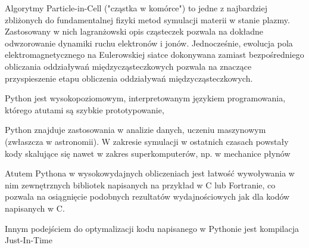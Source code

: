 Algorytmy Particle-in-Cell ("cząstka w komórce") to jedne z najbardziej zbliżonych do fundamentalnej fizyki metod symulacji
materii w stanie plazmy. Zastosowany w nich lagranżowski opis cząsteczek pozwala na dokładne odwzorowanie dynamiki ruchu
elektronów i jonów. Jednocześnie, ewolucja pola elektromagnetycznego na Eulerowskiej siatce dokonywana zamiast bezpośredniego obliczania
oddziaływań międzycząsteczkowych pozwala na znaczące przyspieszenie etapu obliczenia oddziaływań międzycząsteczkowych.

Python jest wysokopoziomowym, interpretowanym językiem programowania, którego atutami są szybkie prototypowanie,

Python znajduje zastosowania w analizie danych, uczeniu maszynowym (zwłaszcza w astronomii). W zakresie symulacji
w ostatnich czasach powstały kody skalujące się nawet w zakres superkomputerów, np. w mechanice płynów %

Atutem Pythona w wysokowydajnych obliczeniach jest łatwość wywoływania w nim zewnętrznych bibliotek napisanych na przykład w C lub Fortranie, co pozwala
na osiągnięcie podobnych rezultatów wydajnościowych jak dla kodów napisanych w C.

Innym podejściem do optymalizacji kodu napisanego w Pythonie jest kompilacja Just-In-Time

